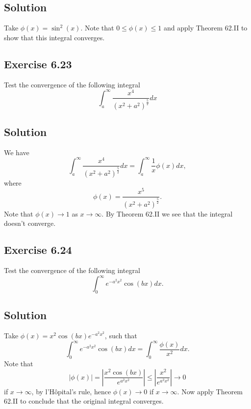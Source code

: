 \subsection*{Solution}

Take $\phi(x) = \sin^2(x)$.
Note that $0 \leq \phi(x) \leq 1$ and apply Theorem 62.II to show that this integral converges.


\subsection*{Exercise 6.23}

Test the convergence of the following integral
\begin{equation*}
    \int_a^{\infty} \frac{x^4}{(x^2 + a^2)^{\frac{5}{2}}} dx
\end{equation*}

\subsection*{Solution}

We have
\begin{equation*}
    \int_a^{\infty} \frac{x^4}{(x^2 + a^2)^{\frac{5}{2}}} dx
        = \int_a^{\infty} \frac{1}{x} \phi(x) dx,
\end{equation*}
where
\begin{equation*}
    \phi(x) = \frac{x^5}{(x^2 + a^2)^{\frac{5}{2}}}.
\end{equation*}
Note that $\phi(x) \to 1$ as $x \to \infty$.
By Theorem 62.II we see that the integral doesn't converge.


\subsection*{Exercise 6.24}

Test the convergence of the following integral
\begin{equation*}
    \int_0^{\infty} e^{-a^2 x^2} \cos(b x) dx.
\end{equation*}

\subsection*{Solution}

Take $\phi(x) = x^2 \cos(bx) e^{-a^2 x^2}$, such that
\begin{equation*}
    \int_0^{\infty} e^{-a^2 x^2} \cos(b x) dx = \int_0^{\infty} \frac{\phi(x)}{x^2} dx.
\end{equation*}
Note that
\begin{equation*}
    |\phi(x)| = \left| \frac{x^2 \cos(bx)}{e^{a^2 x^2}} \right| \leq \left| \frac{x^2}{e^{a^2 x^2}} \right| \to 0
\end{equation*}
if $x \to \infty$, by l'H\^opital's rule, hence $\phi(x) \to 0$ if $x \to \infty$.
Now apply Theorem 62.II to conclude that the original integral converges.



